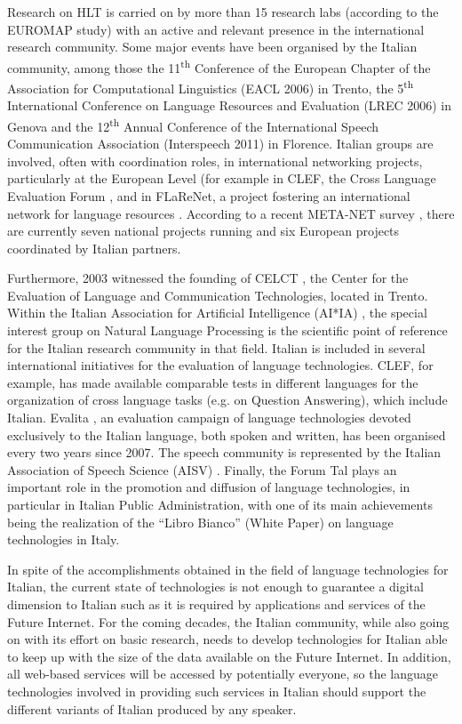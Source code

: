 \documentclass[]{../../metanetpaper}
\begin{document}
\begin{multicols}{2}
Research on HLT is carried on by more than 15 research labs (according to the
EUROMAP study) with an active and relevant presence in the international
research community. Some major events have been organised by the Italian
community, among those the 11\textsuperscript{th} Conference of the European Chapter of the
Association for Computational Linguistics (EACL 2006) in Trento, the 5\textsuperscript{th}
International Conference on Language Resources and Evaluation (LREC 2006) in
Genova and the 12\textsuperscript{th} Annual Conference of the International Speech
Communication Association (Interspeech 2011) in Florence. Italian groups are
involved, often with coordination roles, in international networking projects,
particularly at the European Level (for example in CLEF, the Cross Language
Evaluation Forum \cite{clef}, and in FLaReNet, a project fostering an international network for language resources \cite{flarenet}. According to a recent META-NET survey \cite{soria}, there are currently seven national projects running and six European projects coordinated by Italian partners.

Furthermore, 2003 witnessed the founding of CELCT \cite{celct}, the Center for the
Evaluation of Language and Communication Technologies, located in Trento. Within the Italian Association for Artificial Intelligence (AI*IA) \cite{aixia}, the special interest group on Natural Language Processing is the scientific point of reference for the Italian research community in that field. Italian is included in several international initiatives for the evaluation of language technologies. CLEF, for example, has made available comparable tests in different languages for the organization of cross language tasks (e.g. on Question Answering), which include Italian. Evalita \cite{evalita}, an evaluation campaign of language technologies devoted exclusively to the Italian language, both spoken and written, has been organised every two years since 2007. The speech community is represented by the Italian Association of Speech Science (AISV) \cite{aisv}. Finally, the Forum Tal \cite{forumtal} plays an important role in the promotion and diffusion of language technologies, in particular in Italian Public Administration, with one of its main achievements being the realization of the “Libro Bianco” (White Paper) on language technologies in Italy.

In spite of the accomplishments obtained in the field of language technologies for Italian, the current state of technologies is not enough to guarantee a digital dimension to Italian such as it is required by applications and services of the Future Internet. For the coming decades, the Italian community, while also going on with its effort on basic research, needs to develop technologies for Italian able to keep up with the size of the data available on the Future Internet. In addition, all web-based services will be accessed by potentially everyone, so the language technologies involved in providing such services in Italian should support the different variants of Italian produced by any speaker.




\end{multicols}
\end{document}
